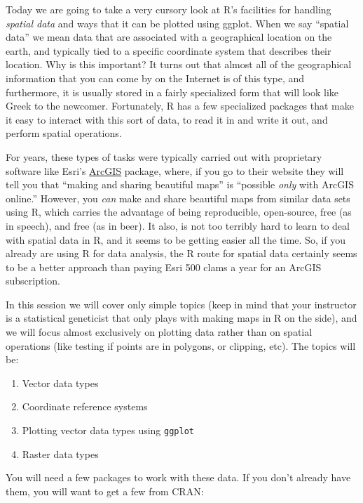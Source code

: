 \documentclass[]{book}
\providecommand{\tightlist}{%
  \setlength{\itemsep}{0pt}\setlength{\parskip}{0pt}}
\theoremstyle{definition}
\theoremstyle{definition}
\theoremstyle{remark}
\begin{document}
Today we are going to take a very cursory look at R's facilities for
handling \emph{spatial data} and ways that it can be plotted using
ggplot. When we say ``spatial data'' we mean data that are associated
with a geographical location on the earth, and typically tied to a
specific coordinate system that describes their location. Why is this
important? It turns out that almost all of the geographical information
that you can come by on the Internet is of this type, and furthermore,
it is usually stored in a fairly specialized form that will look like
Greek to the newcomer. Fortunately, R has a few specialized packages
that make it easy to interact with this sort of data, to read it in and
write it out, and perform spatial operations.

For years, these types of tasks were typically carried out with
proprietary software like Esri's
\href{https://www.arcgis.com/features/index.html}{ArcGIS} package,
where, if you go to their website they will tell you that ``making and
sharing beautiful maps'' is ``possible \emph{only} with ArcGIS online.''
However, you \emph{can} make and share beautiful maps from similar data
sets using R, which carries the advantage of being reproducible,
open-source, free (as in speech), and free (as in beer). It also, is not
too terribly hard to learn to deal with spatial data in R, and it seems
to be getting easier all the time. So, if you already are using R for
data analysis, the R route for spatial data certainly seems to be a
better approach than paying Esri 500 clams a year for an ArcGIS
subscription.

In this session we will cover only simple topics (keep in mind that your
instructor is a statistical geneticist that only plays with making maps
in R on the side), and we will focus almost exclusively on plotting data
rather than on spatial operations (like testing if points are in
polygons, or clipping, etc). The topics will be:

\begin{enumerate}
\def\labelenumi{\arabic{enumi}.}
\tightlist
\item
  Vector data types
\item
  Coordinate reference systems
\item
  Plotting vector data types using \texttt{ggplot}
\item
  Raster data types
\end{enumerate}

You will need a few packages to work with these data. If you don't
already have them, you will want to get a few from CRAN:
\end{document}
